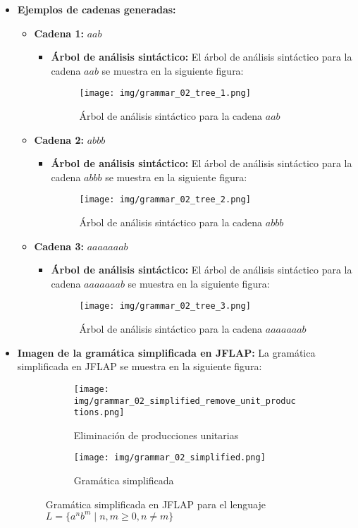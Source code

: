 \documentclass[11pt]{report}
\begin{document}
\begin{itemize}
  \item \textbf{Ejemplos de cadenas generadas:}
  \begin{itemize}
    \item \textbf{Cadena 1:} $aab$
    \begin{itemize}
      \item \textbf{Árbol de análisis sintáctico:} El árbol de análisis sintáctico para la cadena $aab$ se muestra en la siguiente figura:
      \begin{figure}[H]
        \centering
        \texttt{[image: img/grammar\_02\_tree\_1.png]}
        \caption{Árbol de análisis sintáctico para la cadena $aab$}
        \label{fig:arbol4}
      \end{figure}
    \end{itemize}
    \item \textbf{Cadena 2:} $abbb$
    \begin{itemize}
      \item \textbf{Árbol de análisis sintáctico:} El árbol de análisis sintáctico para la cadena $abbb$ se muestra en la siguiente figura:
      \begin{figure}[H]
        \centering
        \texttt{[image: img/grammar\_02\_tree\_2.png]}
        \caption{Árbol de análisis sintáctico para la cadena $abbb$}
        \label{fig:arbol5}
      \end{figure}
    \end{itemize}
    \item \textbf{Cadena 3:} $aaaaaaab$
    \begin{itemize}
      \item \textbf{Árbol de análisis sintáctico:} El árbol de análisis sintáctico para la cadena $aaaaaaab$ se muestra en la siguiente figura:
      \begin{figure}[H]
        \centering
        \texttt{[image: img/grammar\_02\_tree\_3.png]}
        \caption{Árbol de análisis sintáctico para la cadena $aaaaaaab$}
        \label{fig:arbol6}
      \end{figure}
    \end{itemize}
  \end{itemize}
  \item \textbf{Imagen de la gramática simplificada en JFLAP:} La gramática simplificada en JFLAP se muestra en la siguiente figura:

  \begin{figure}[H]
    \begin{subfigure}{0.5\textwidth}
      \centering
      \texttt{[image: img/grammar\_02\_simplified\_remove\_unit\_productions.png]}
      \caption{Eliminación de producciones unitarias}
    \end{subfigure}%
    \begin{subfigure}{0.5\textwidth}
      \centering
      \texttt{[image: img/grammar\_02\_simplified.png]}
      \caption{Gramática simplificada}
    \end{subfigure}
    \caption{Gramática simplificada en JFLAP para el lenguaje $L = \{a^n b^m \mid n, m \geq 0, n \neq m\}$}
  \end{figure}
\end{itemize}
\end{document}
